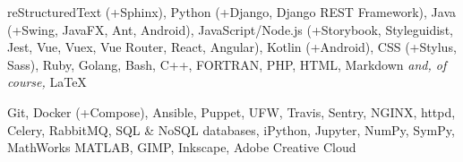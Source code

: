 
\sectiondescription
{
reStructuredText (+Sphinx),
Python (+Django, Django REST Framework),
Java (+Swing, JavaFX, Ant, Android),
JavaScript/Node.js (+Storybook, Styleguidist, Jest, Vue, Vuex, Vue Router, React, Angular),
Kotlin (+Android),
CSS (+Stylus, Sass),
Ruby, Golang,
Bash, C++, FORTRAN,
PHP, HTML, Markdown
\textit{and, of course,} {\selectfont\LaTeX}
}

\sectiondescription
{
Git,
Docker (+Compose),
Ansible, Puppet, UFW,
Travis, Sentry,
NGINX, httpd, Celery, RabbitMQ, SQL \& NoSQL databases,
iPython, Jupyter, NumPy, SymPy, MathWorks MATLAB,
GIMP, Inkscape, Adobe Creative Cloud
}
